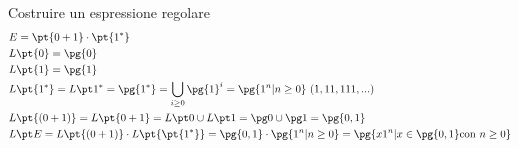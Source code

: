 \begin{example}{Costruire un espressione regolare}{}
    \[
        \begin{aligned}
            &E = \pt{0+1}\cdot \pt{1^*} \\
            &L\pt{0} = \pg{0} \\
            &L\pt{1} = \pg{1} \\
            &L\pt{1^*} = L\pt 1^* = \pg{1^*} = \bigcup_{i\ge0}{\pg{1}^i} = \pg{1^n | n\ge0}\,\,(1, 11, 111, ...) \\
            &L\pt{(0+1)} = L\pt{0+1} = L\pt 0 \cup L\pt 1 = \pg 0 \cup \pg 1 = \pg{0,1} \\
            &L\pt E = L\pt{(0+1)} \cdot L\pt{\pt{1^*}} = \pg{0,1} \cdot \pg{1^n | n \ge 0} = \pg{x1^n | x\in\pg{0,1} \text{con } n\ge 0}
        \end{aligned}
    \]
\end{example}
